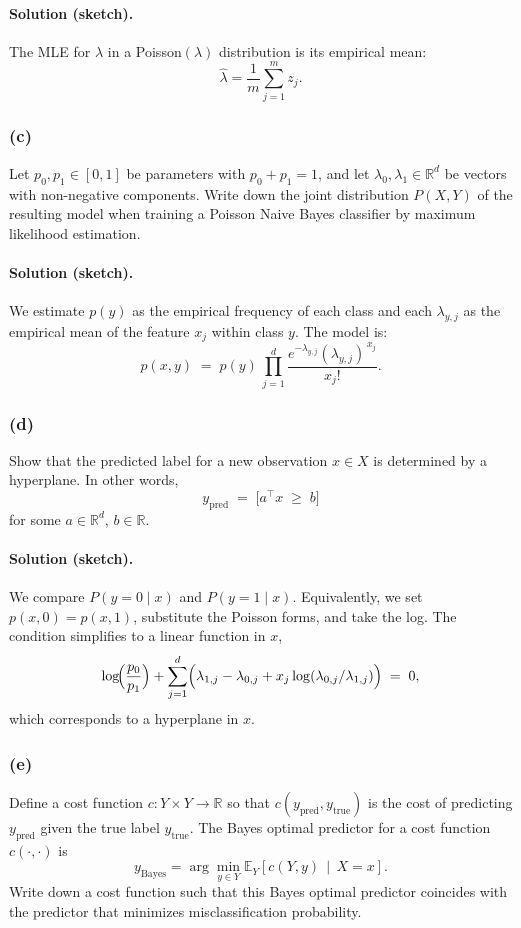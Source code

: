 \documentclass[twocolumn]{article}
\begin{document}
\begin{spacing}{1}
\paragraph{Solution (sketch).}
The MLE for $\lambda$ in a Poisson$(\lambda)$ distribution is its empirical mean:
\[
\hat{\lambda} = \frac{1}{m}\sum_{j=1}^m z_j.
\]

\subsubsection{(c)}
Let $p_0, p_1 \in [0,1]$ be parameters with $p_0 + p_1 = 1$, and let $\lambda_0, \lambda_1 \in \mathbb{R}^d$ be vectors with non-negative components. Write down the joint distribution $P(X,Y)$ of the resulting model when training a Poisson Naive Bayes classifier by maximum likelihood estimation.

\paragraph{Solution (sketch).}
We estimate $p(y)$ as the empirical frequency of each class and each $\lambda_{y,j}$ as the empirical mean of the feature $x_j$ within class $y$. The model is:
\[
p(x, y) \;=\; p(y) \,\prod_{j=1}^d \frac{e^{-\lambda_{y,j}} (\lambda_{y,j})^{\,x_j}}{x_j!}.
\]

\subsubsection{(d)}
Show that the predicted label for a new observation $x \in X$ is determined by a hyperplane. In other words,
\[
y_{\mathrm{pred}} \;=\; \bigl[a^\top x \;\ge\; b\bigr]
\]
for some $a \in \mathbb{R}^d$, $b \in \mathbb{R}$.

\paragraph{Solution (sketch).}
We compare $P(y=0 \mid x)$ and $P(y=1 \mid x)$. Equivalently, we set $p(x, 0) = p(x, 1)$, substitute the Poisson forms, and take the log. The condition simplifies to a linear function in $x$,
\[
\log\!\Bigl(\frac{p_0}{p_1}\Bigr)
+ \sum_{j=1}^d \Bigl(\lambda_{1,j} - \lambda_{0,j} + x_j \log(\lambda_{0,j}/\lambda_{1,j})\Bigr) \;=\; 0,
\]
which corresponds to a hyperplane in $x$.

\subsubsection{(e)}
Define a cost function $c : Y \times Y \to \mathbb{R}$ so that $c(y_{\mathrm{pred}}, y_{\mathrm{true}})$ is the cost of predicting $y_{\mathrm{pred}}$ given the true label $y_{\mathrm{true}}$. The Bayes optimal predictor for a cost function $c(\cdot, \cdot)$ is
\[
y_{\mathrm{Bayes}} = \arg\min_{y \in Y} \mathbb{E}_{Y}[c(Y,y)\,\mid\,X=x].
\]
Write down a cost function such that this Bayes optimal predictor coincides with the predictor that minimizes misclassification probability.


\end{spacing}
\end{document}
